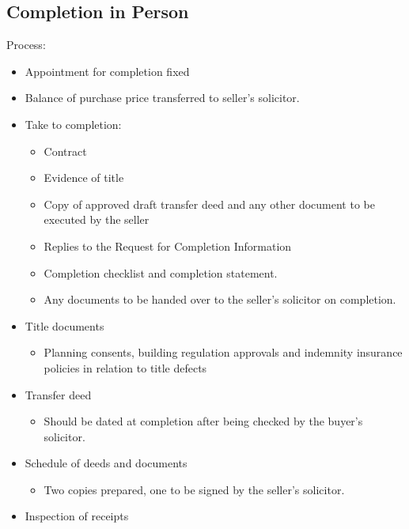 \documentclass[
]{article}
\providecommand{\tightlist}{%
  \setlength{\itemsep}{0pt}\setlength{\parskip}{0pt}}
\begin{document}
\hypertarget{completion-in-person}{%
\subsection{Completion in Person}\label{completion-in-person}}

Process:

\begin{itemize}
\tightlist
\item
  Appointment for completion fixed
\item
  Balance of purchase price transferred to seller's solicitor.
\item
  Take to completion:

  \begin{itemize}
  \tightlist
  \item
    Contract
  \item
    Evidence of title
  \item
    Copy of approved draft transfer deed and any other document to be
    executed by the seller
  \item
    Replies to the Request for Completion Information
  \item
    Completion checklist and completion statement.
  \item
    Any documents to be handed over to the seller's solicitor on
    completion.
  \end{itemize}
\item
  Title documents

  \begin{itemize}
  \tightlist
  \item
    Planning consents, building regulation approvals and indemnity
    insurance policies in relation to title defects
  \end{itemize}
\item
  Transfer deed

  \begin{itemize}
  \tightlist
  \item
    Should be dated at completion after being checked by the buyer's
    solicitor.
  \end{itemize}
\item
  Schedule of deeds and documents

  \begin{itemize}
  \tightlist
  \item
    Two copies prepared, one to be signed by the seller's solicitor.
  \end{itemize}
\item
  Inspection of receipts


\end{itemize}
\end{document}
